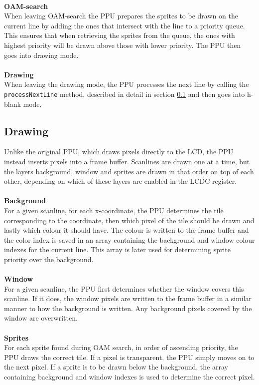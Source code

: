 \\
\textbf{OAM-search}\\
When leaving OAM-search the PPU prepares the sprites to be drawn on the current line by adding the ones that intersect with the line to a priority queue. This ensures that when retrieving the sprites from the queue, the ones with highest priority will be drawn above those with lower priority. The PPU then goes into drawing mode.\\
\\
\textbf{Drawing}\\
When leaving the drawing mode, the PPU processes the next line by calling the \texttt{processNextLine} method, described in detail in section \ref{sec:result-drawing} and then goes into h-blank mode.

\subsection{Drawing}
\label{sec:result-drawing}
Unlike the original PPU, which draws pixels directly to the LCD, the PPU instead inserts pixels into a frame buffer. Scanlines are drawn one at a time, but the layers background, window and sprites are drawn in that order on top of each other, depending on which of these layers are enabled in the LCDC register.\\
\\
\textbf{Background}\\
For a given scanline, for each x-coordinate, the PPU determines the tile corresponding to the coordinate, then which pixel of the tile should be drawn and lastly which colour it should have. The colour is written to the frame buffer and the color index is saved in an array containing the background and window colour indexes for the current line. This array is later used for determining sprite priority over the background.\\
\\
\textbf{Window}\\
For a given scanline, the PPU first determines whether the window covers this scanline. If it does, the window pixels are written to the frame buffer in a similar manner to how the background is written. Any background pixels covered by the window are overwritten.\\
\\
\textbf{Sprites}\\
For each sprite found during OAM search, in order of ascending priority, the PPU draws the correct tile. If a pixel is transparent, the PPU simply moves on to the next pixel. If a sprite is to be drawn below the background, the array containing background and window indexes is used to determine the correct pixel.

